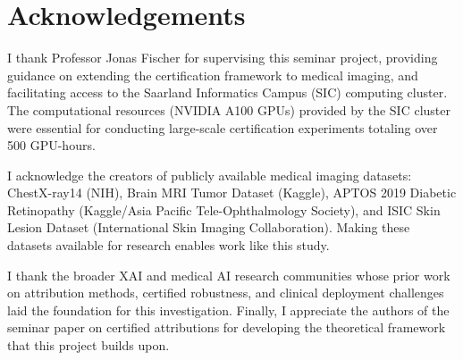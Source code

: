 \documentclass[11pt]{article}
\begin{document}
\section*{Acknowledgements}

I thank Professor Jonas Fischer for supervising this seminar project, providing guidance on extending the certification framework to medical imaging, and facilitating access to the Saarland Informatics Campus (SIC) computing cluster. The computational resources (NVIDIA A100 GPUs) provided by the SIC cluster were essential for conducting large-scale certification experiments totaling over 500 GPU-hours.

I acknowledge the creators of publicly available medical imaging datasets: ChestX-ray14 (NIH), Brain MRI Tumor Dataset (Kaggle), APTOS 2019 Diabetic Retinopathy (Kaggle/Asia Pacific Tele-Ophthalmology Society), and ISIC Skin Lesion Dataset (International Skin Imaging Collaboration). Making these datasets available for research enables work like this study.

I thank the broader XAI and medical AI research communities whose prior work on attribution methods, certified robustness, and clinical deployment challenges laid the foundation for this investigation. Finally, I appreciate the authors of the seminar paper on certified attributions for developing the theoretical framework that this project builds upon.



\end{document}
